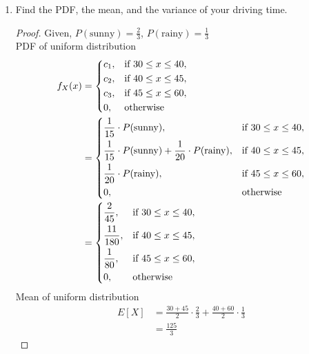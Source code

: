 \documentclass[paper=usletter, fontsize=12pt]{article}
\begin{document}
\begin{enumerate}
\begin{enumerate}
            \item Find the PDF, the mean, and the variance of your driving
            time.
            \begin{proof}

                Given, $P(\text{sunny}) = \frac{2}{3}$, $P(\text{rainy}) =
                \frac{1}{3}$\\

                PDF of uniform distribution
                \begin{align*}
                    f_X(x) & =
                    \begin{dcases}
                        c_1,  & \text{if } 30 \le x \le 40,\\
                        c_2,  & \text{if } 40 \le x \le 45,\\
                        c_3,  & \text{if } 45 \le x \le 60,\\
                        0,    & \text{otherwise}
                    \end{dcases}\\
                    & = \begin{dcases}
                        \frac{1}{15} \cdot P(\text{sunny}), & \text{if } 30 \le x \le 40,\\
                        \frac{1}{15} \cdot P(\text{sunny}) + \frac{1}{20} \cdot P(\text{rainy}), & \text{if } 40 \le x \le 45,\\
                        \frac{1}{20} \cdot P(\text{rainy}), & \text{if } 45 \le x \le 60,\\
                        0,    & \text{otherwise}
                    \end{dcases}\\
                    & =\begin{dcases}
                        \frac{2}{45}, & \text{if } 30 \le x \le 40,\\
                        \frac{11}{180}, & \text{if } 40 \le x \le 45,\\
                        \frac{1}{80}, & \text{if } 45 \le x \le 60,\\
                        0,    & \text{otherwise}
                    \end{dcases}
                \end{align*}
                \endgroup
                Mean of uniform distribution
                \begin{align*}
                    E[X] & = \frac{30+45}{2} \cdot \frac{2}{3} + \frac{40+60}{2} \cdot \frac{1}{3}\\
                    & = \frac{125}{3}
                \end{align*}
                \endgroup


\end{proof}
\end{enumerate}
\end{enumerate}
\end{document}
